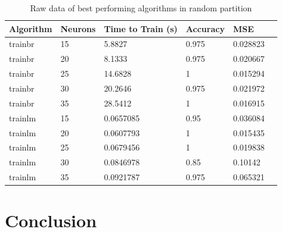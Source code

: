 \documentclass[a4paper, 10pt, conference]{ieeeconf}
\begin{document}
\begin{table}
\centering
\caption{Raw data of best performing algorithms in random partition}
\label{tbl:mixed}
\begin{tabular}{llllll}
\hline
\textbf{Algorithm} & \textbf{Neurons} & \textbf{Time to Train (s)} & \textbf{Accuracy} & \textbf{MSE} \\ \hline
trainbr & 15 & 5.8827 & 0.975 & 0.028823 \\ \hline 
trainbr & 20 & 8.1333 & 0.975 & 0.020667 \\ \hline 
trainbr & 25 & 14.6828 & 1 & 0.015294 \\ \hline 
trainbr & 30 & 20.2646 & 0.975 & 0.021972 \\ \hline 
trainbr & 35 & 28.5412 & 1 & 0.016915 \\ \hline 

trainlm & 15 & 0.0657085 & 0.95 & 0.036084 \\ \hline 
trainlm & 20 & 0.0607793 & 1 & 0.015435 \\ \hline 
trainlm & 25 & 0.0679456 & 1 & 0.019838 \\ \hline 
trainlm & 30 & 0.0846978 & 0.85 & 0.10142 \\ \hline 
trainlm & 35 & 0.0921787 & 0.975 & 0.065321 \\ \hline 
\end{tabular}
\end{table}






\section{Conclusion}
\end{document}
